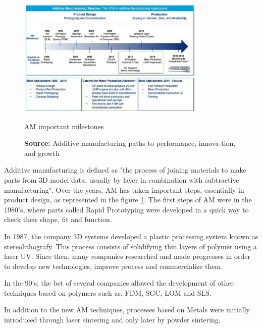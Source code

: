 \begin{figure}[h]
\centering
\includegraphics[width=0.8\textwidth]{./Images/AM_HISTORY}
\caption{AM important milestones}
\caption*{
\textbf{Source:} Additive manufacturing paths to performance, innova-tion, and growth\cite{cotteleer20143d}}
\label{AMHist}
\end{figure}
Additive manufacturing is defined as "the process of joining materials to make parts from 3D model data, usually by layer in combination with subtractive manufacturing"\cite{lee2017fundamentals}.
Over the years, AM has taken important steps, essentially in product design, as represented in the figure \ref{AMHist}.
The first steps of AM were in the 1980's, where parts called Rapid Prototyping were developed in a quick way to check their shape, fit and function\cite{bartolo2011history,bourell2016perspectives,wohlers2014history}.\par
In 1987, the company 3D systems developed a plastic processing system known as stereolithografy. This process consists of solidifying thin layers of polymer using a laser UV. Since then, many companies researched and made progresses in order to develop new technologies, improve process and commercialize them. \cite{bourell2016perspectives,wohlers2014history}\par
In the 90's, the bet of several companies allowed the development of other techniques based on polymers such as, \ac{FDM}, \ac{SGC},  \ac{LOM} and  \ac{SLS}.\cite{bourell2016perspectives,wohlers2014history}\par
In addition to the new AM techniques, processes based on Metals were initially introduced through laser sintering and only later by powder sintering.\cite{bourell2016perspectives,wohlers2014history}\par

